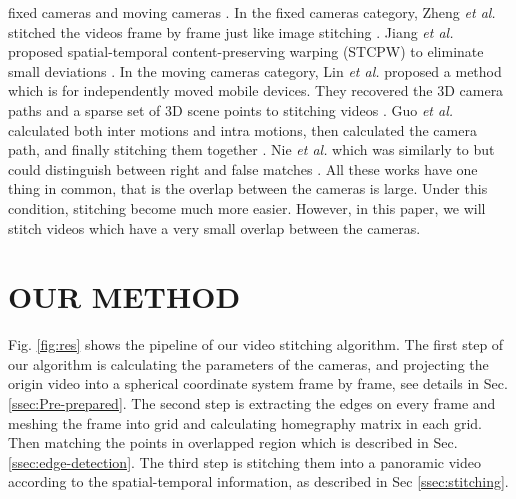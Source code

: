 \documentclass[conference]{IEEEtran}
\begin{document}
fixed cameras \cite{zheng2008stitching, he2010panoramic, Jiang_2015_CVPR_Workshops, perazzi2015panoramic, li2015efficient} 
and moving cameras \cite{lin2016seamless, guo2016joint, nie2018dynamic}. In the fixed cameras category, 
Zheng \textit{et al.} stitched the videos frame by frame just like image stitching \cite{zheng2008stitching}.
Jiang \textit{et al.} proposed spatial-temporal content-preserving warping (STCPW) to eliminate small deviations \cite{Jiang_2015_CVPR_Workshops}.
In the moving cameras category, 
Lin \textit{et al.} proposed a method which is for independently moved mobile devices.
They recovered the 3D camera paths and a sparse set of 3D scene points to stitching videos \cite{lin2016seamless}.
Guo \textit{et al.} calculated both inter
motions and intra motions, then calculated the camera path, and finally stitching them together \cite{guo2016joint}.
Nie \textit{et al.} which was similarly to \cite{guo2016joint} but could distinguish between right
and false matches \cite{nie2018dynamic}. All these works have one thing in common, that
is the overlap between the cameras is large. Under this condition, stitching 
become much more easier. However, in this paper, we will stitch videos
which have a very small overlap between the cameras.

\section{OUR METHOD}
\label{sec:ourmethod}

Fig. \ref{fig:res} shows the pipeline of our video stitching algorithm.
The first step of our algorithm is calculating the parameters of the cameras, and projecting the origin video into a spherical coordinate system frame by frame, 
see details in Sec. \ref{ssec:Pre-prepared}. The second step is extracting the edges on every frame and meshing the frame into grid and calculating homegraphy matrix in each grid. 
Then matching the points in overlapped region which is described in Sec. \ref{ssec:edge-detection}. 
The third step is stitching them into a panoramic video according to the spatial-temporal information, as described in Sec \ref{ssec:stitching}.
\end{document}
